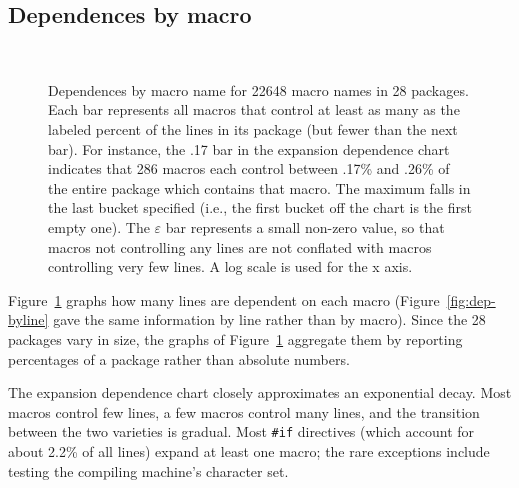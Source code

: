 \documentclass[10pt]{article}
\def\numpackageslesstwo{28}
\newcommand{\captionsmall}[1]{\caption[]{\small #1}}
\begin{document}
\subsection{Dependences by macro}

\begin{figure}
\centerline{%
~%
}
\captionsmall{Dependences by macro name for 22648 macro names in 28 packages.
  Each bar represents all macros that control at least as many as the
  labeled percent of the lines in its package (but fewer than the next
  bar).  For instance, the .17 bar in the expansion dependence chart
  indicates that 286 macros each control between .17\% and .26\% of the
  entire package which contains that macro.  The maximum falls in the last
  bucket specified (i.e., the first bucket off the chart is the first empty
  one).  The $\varepsilon$ bar represents a small non-zero value, so that
  macros not controlling any lines are not conflated with macros
  controlling very few lines.  A log scale is used for the x axis.}

\label{fig:dep-bymacro}
\end{figure}

Figure~\ref{fig:dep-bymacro} graphs how many lines are dependent on each
macro (Figure~\ref{fig:dep-byline} gave the same information by line rather
than by macro).  Since the {\numpackageslesstwo} packages vary in size, the
graphs of Figure~\ref{fig:dep-bymacro} aggregate them by reporting
percentages of a package rather than absolute numbers.


The expansion dependence chart closely approximates an exponential decay.
Most macros control few lines, a few macros control many lines, and the
transition between the two varieties is gradual.  Most {\tt \#if}
directives (which account for about 2.2\% of all lines) expand at least one
macro; the rare exceptions include testing the compiling machine's
character set.
\end{document}
